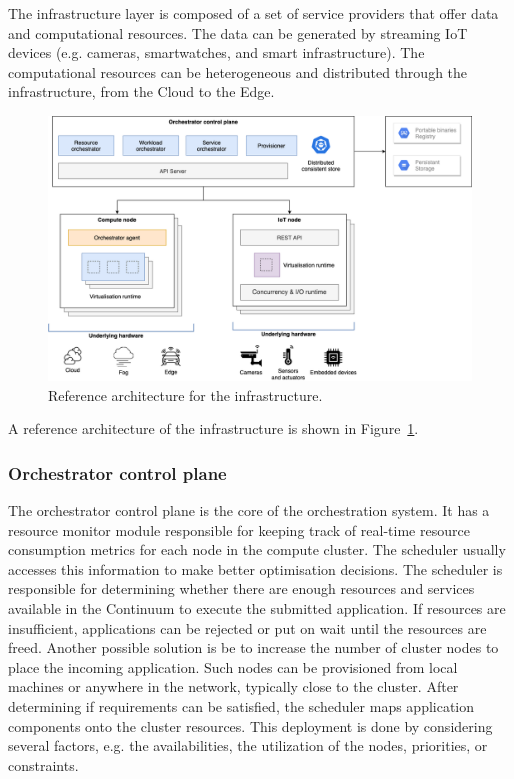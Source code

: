 The infrastructure layer is composed of a set of service providers that offer data and computational resources. The data can be generated by streaming IoT devices (e.g. cameras, smartwatches, and smart infrastructure). 
The computational resources can be heterogeneous and distributed through the infrastructure, from the Cloud to the Edge.

\begin{figure}[ht]
\centering
\includegraphics[width=\columnwidth]{figures/architecture-broad}
\caption{Reference architecture for the infrastructure.}
\label{fig:architecture-broad}
\end{figure}

A reference architecture of the infrastructure is shown in Figure~\ref{fig:architecture-broad}.

\subsubsection{Orchestrator control plane}

The orchestrator control plane is the core of the orchestration system. It has a resource monitor module responsible for keeping track of real-time resource consumption metrics for each node in the compute cluster. The scheduler usually accesses this information to make better optimisation decisions. The scheduler is responsible for determining whether there are enough resources and services available in the Continuum to execute the submitted application. If resources are insufficient, applications can be rejected or put on wait until the resources are freed. Another possible solution is be to increase the number of cluster nodes to place the incoming application. Such nodes can be provisioned from local machines or anywhere in the network, typically close to the cluster. After determining if requirements can be satisfied, the scheduler maps application components onto the cluster resources. This deployment is done by considering several factors, e.g. the availabilities, the utilization of the nodes, priorities, or constraints.

